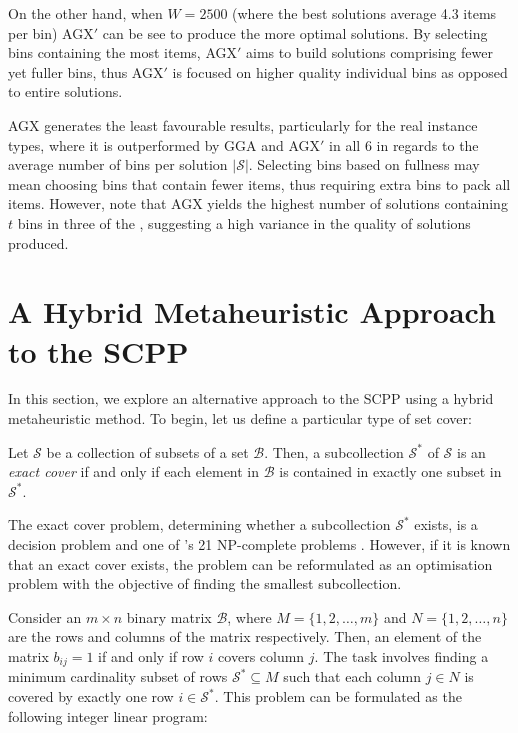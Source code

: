 \documentclass[authoryear]{elsarticle}
\begin{document}
On the other hand, when $W = 2500$  (where the best solutions average 4.3 items per bin) AGX$'$ can be see to produce the more optimal solutions. By selecting bins containing the most items, AGX$'$ aims to build solutions comprising fewer yet fuller bins, thus AGX$'$ is focused on higher quality individual bins as opposed to entire solutions. 

AGX generates the least favourable results, particularly for the real instance types, where it is outperformed by GGA and AGX$'$ in all 6  in regards to the average number of bins per solution $|\mathcal{S}|$. Selecting bins based on fullness may mean choosing bins that contain fewer items, thus requiring extra bins to pack all items. However, note that AGX yields the highest number of solutions containing $t$ bins in three of the , suggesting a high variance in the quality of solutions produced.


\section{A Hybrid Metaheuristic Approach to the SCPP}
\label{sec:cmsa}
\noindent In this section, we explore an alternative approach to the SCPP using a hybrid metaheuristic method. To begin, let us define a particular type of set cover:

\begin{definition}
	\label{defn:exactcover}
	Let $\mathcal{S}$ be a collection of subsets of a set $\mathcal{B}$. Then, a subcollection $\mathcal{S}^*$ of $\mathcal{S}$ is an \emph{exact cover} if and only if each element in $\mathcal{B}$ is contained in exactly one subset in $\mathcal{S}^*$.
\end{definition}	

\noindent The exact cover problem, determining whether a subcollection $\mathcal{S}^*$ exists, is a decision problem and one of \citeauthor{karp1972}'s 21 NP-complete problems \citeyearpar{karp1972}. However, if it is known that an exact cover exists, the problem can be reformulated as an optimisation problem with the objective of finding the smallest subcollection.

Consider an $m\times n$ binary matrix $\mathcal{B}$, where $M = \{1,2,\dotsc,m\}$ and $N = \{1,2,\dotsc,n\}$ are the rows and columns of the matrix respectively. Then, an element of the matrix $b_{ij} = 1$ if and only if row $i$ covers column $j$. The task involves finding a minimum cardinality subset of rows $\mathcal{S}^* \subseteq M$ such that each column $j \in N$ is covered by exactly one row $i \in \mathcal{S}^*$. This problem can be formulated as the following integer linear program:
\end{document}
